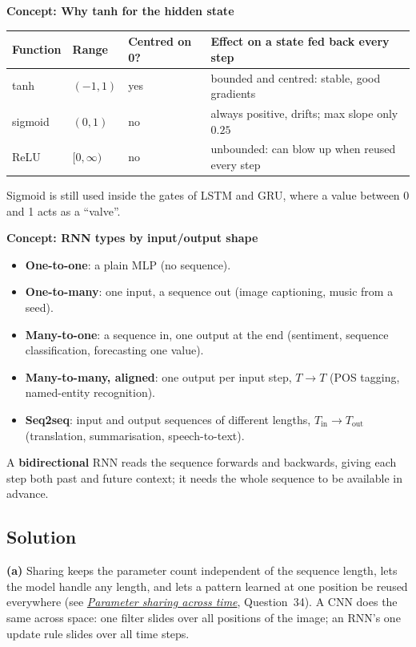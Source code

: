 \documentclass[12pt,a4paper]{article}
\newcommand{\concept}[2]{\par\medskip\phantomsection\label{#1}{\large\bfseries\color{blue!50!black} Concept: #2}\par}
\newcommand{\seeconcept}[3]{(see \hyperref[#1]{\textit{#2}}, Question~#3)}
\begin{document}
\concept{c:whytanh}{Why tanh for the hidden state}
\begin{center}
\begin{tabular}{@{}llll@{}}
\toprule
Function & Range & Centred on 0? & Effect on a state fed back every step\\
\midrule
tanh & $(-1,1)$ & yes & bounded and centred: stable, good gradients\\
sigmoid & $(0,1)$ & no & always positive, drifts; max slope only $0.25$\\
ReLU & $[0,\infty)$ & no & unbounded: can blow up when reused every step\\
\bottomrule
\end{tabular}
\end{center}
Sigmoid is still used inside the gates of LSTM and GRU, where a value between 0 and 1 acts as a ``valve''.

\concept{c:rnntypes}{RNN types by input/output shape}
\begin{itemize}[nosep]
\item \textbf{One-to-one}: a plain MLP (no sequence).
\item \textbf{One-to-many}: one input, a sequence out (image captioning, music from a seed).
\item \textbf{Many-to-one}: a sequence in, one output at the end (sentiment, sequence classification, forecasting one value).
\item \textbf{Many-to-many, aligned}: one output per input step, $T\to T$ (POS tagging, named-entity recognition).
\item \textbf{Seq2seq}: input and output sequences of different lengths, $T_{\text{in}}\to T_{\text{out}}$ (translation, summarisation, speech-to-text).
\end{itemize}
A \textbf{bidirectional} RNN reads the sequence forwards and backwards, giving each step both past and future context; it needs the whole sequence to be available in advance.

\subsection*{Solution}
\textbf{(a)} Sharing keeps the parameter count independent of the sequence length, lets the model handle any length, and lets a pattern learned at one position be reused everywhere \seeconcept{c:timesharing}{Parameter sharing across time}{34}. A CNN does the same across space: one filter slides over all positions of the image; an RNN's one update rule slides over all time steps.
\end{document}
